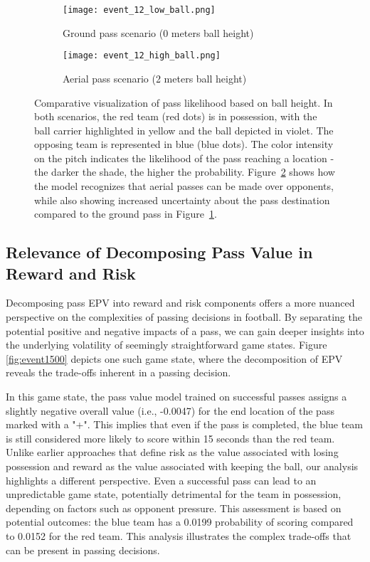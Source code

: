 \begin{figure}[h!]
\centering
\begin{subfigure}{0.48\textwidth}
    \texttt{[image: event\_12\_low\_ball.png]}
    \caption{Ground pass scenario (0 meters ball height)}
    \label{fig:ball_height_ground}
\end{subfigure}
\hfill
\begin{subfigure}{0.48\textwidth}
    \texttt{[image: event\_12\_high\_ball.png]}
    \caption{Aerial pass scenario (2 meters ball height)}
    \label{fig:ball_height_aerial}
\end{subfigure}
\caption{Comparative visualization of pass likelihood based on ball height. In both scenarios, the red team (red dots) is in possession, with the ball carrier highlighted in yellow and the ball depicted in violet. The opposing team is represented in blue (blue dots). The color intensity on the pitch indicates the likelihood of the pass reaching a location - the darker the shade, the higher the probability. Figure~\ref{fig:ball_height_aerial} shows how the model recognizes that aerial passes can be made over opponents, while also showing increased uncertainty about the pass destination compared to the ground pass in Figure~\ref{fig:ball_height_ground}.}
\label{fig:ball_heights}
\end{figure}

\newpage
\subsection{Relevance of Decomposing Pass Value in Reward and Risk}

Decomposing pass EPV into reward and risk components offers a more nuanced perspective on the complexities of passing decisions in football. By separating the potential positive and negative impacts of a pass, we can gain deeper insights into the underlying volatility of seemingly straightforward game states.  Figure \ref{fig:event1500} depicts one such game state, where the decomposition of EPV reveals the trade-offs inherent in a passing decision.

In this game state, the pass value model trained on successful passes assigns a slightly negative overall value (i.e., -0.0047) for the end location of the pass marked with a "+". This implies that even if the pass is completed, the blue team is still considered more likely to score within 15 seconds than the red team. Unlike earlier approaches that define risk as the value associated with losing possession and reward as the value associated with keeping the ball, our analysis highlights a different perspective. Even a successful pass can lead to an unpredictable game state, potentially detrimental for the team in possession, depending on factors such as opponent pressure. This assessment is based on potential outcomes: the blue team has a 0.0199 probability of scoring compared to 0.0152 for the red team. This analysis illustrates the complex trade-offs that can be present in passing decisions.


